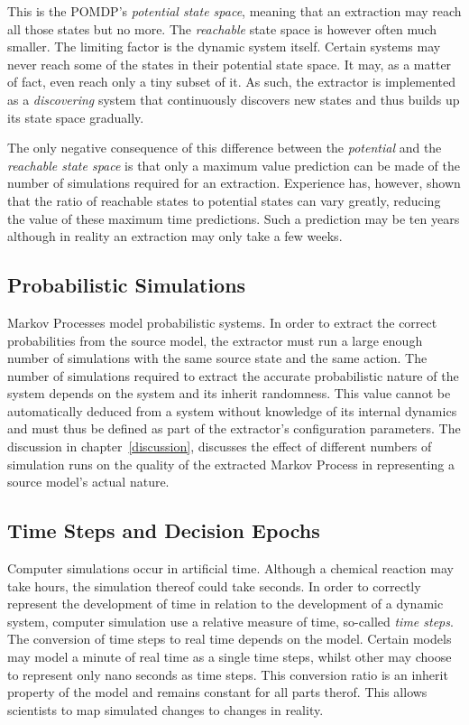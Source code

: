 This is the POMDP's \textit{potential state space}, meaning that an extraction may reach all those states but no more. The \textit{reachable} state space is however often much smaller. The limiting factor is the dynamic system itself. Certain systems may never reach some of the states in their potential state space. It may, as a matter of fact, even reach only a tiny subset of it. As such, the extractor is implemented as a \textit{discovering} system that continuously discovers new states and thus builds up its state space gradually.

The only negative consequence of this difference between the \textit{potential} and the \textit{reachable state space} is that only a maximum value prediction can be made of the number of simulations required for an extraction. Experience has, however, shown that the ratio of reachable states to potential states can vary greatly, reducing the value of these maximum time predictions. Such a prediction may be ten years although in reality an extraction may only take a few weeks.

\subsection{Probabilistic Simulations}
\label{sec:probabilisticsimulation}

Markov Processes model probabilistic systems. In order to extract the correct probabilities from the source model, the extractor must run a large enough number of simulations with the same source state and the same action. The number of simulations required to extract the accurate probabilistic nature of the system depends on the system and its inherit randomness. This value cannot be automatically deduced from a system without knowledge of its internal dynamics and must thus be defined as part of the extractor's configuration parameters. The discussion in chapter~\ref{discussion}, discusses the effect of different numbers of simulation runs on the quality of the extracted Markov Process in representing a source model's actual nature.

\subsection{Time Steps and Decision Epochs}
\label{subsec:timestepsdecisionepochs}

Computer simulations occur in artificial time. Although a chemical reaction may take hours, the simulation thereof could take seconds. In order to correctly represent the development of time in relation to the development of a dynamic system, computer simulation use a relative measure of time, so-called \textit{time steps}. The conversion of time steps to real time depends on the model. Certain models may model a minute of real time as a single time steps, whilst other may choose to represent only nano seconds as time steps. This conversion ratio is an inherit property of the model and remains constant for all parts therof. This allows scientists to map simulated changes to changes in reality.

